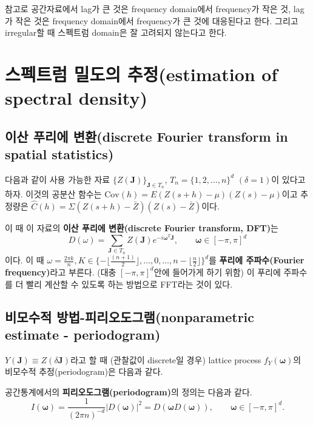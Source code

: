 \documentclass[b5paper,]{scrbook}
\theoremstyle{plain}
\theoremstyle{definition}
\numberwithin{equation}{section}
\let\BeginKnitrBlock\begin \let\EndKnitrBlock\end
\begin{document}
참고로 공간자료에서 lag가 큰 것은 frequency domain에서 frequency가 작은 것, lag가 작은 것은 frequency domain에서 frequency가 큰 것에 대응된다고 한다. 그리고 irregular할 때 스펙트럼 domain은 잘 고려되지 않는다고 한다.

\hypertarget{--estimation-of-spectral-density}{%
\section{스펙트럼 밀도의 추정(estimation of spectral density)}\label{--estimation-of-spectral-density}}

\hypertarget{--discrete-fourier-transform-in-spatial-statistics}{%
\subsection{이산 푸리에 변환(discrete Fourier transform in spatial statistics)}\label{--discrete-fourier-transform-in-spatial-statistics}}

다음과 같이 사용 가능한 자료 \(\{Z(\mathbf{J}) \}_{\mathbf{J}\in T_{n}}\), \(T_{n}=\{ 1,2,\ldots, n\}^{d}\) \((\delta=1)\)이 있다고 하자. 이것의 공분산 함수는 \(\text{Cov}(h)=E(Z(s+h)-\mu)(Z(s)-\mu)\)이고 추정량은 \(\hat{C}(h)=\Sigma(Z(s+h)-\bar{Z})(Z(s)-\bar{Z})\)이다.

이 때 이 자료의 \textbf{이산 푸리에 변환(discrete Fourier transform, DFT)}는
\[D(\omega)=\sum_{\mathbf{J}\in T_{n}}Z(\mathbf{J})e^{-i\boldsymbol{\omega}^{T}\mathbf{J}}, \qquad{\boldsymbol{\omega}\in[-\pi,\pi]^{d}}\]
이다. 이 때 \(\omega = \frac{2\pi k}{n}, K\in \{ -\lfloor\frac{(n+1)}{2}\rfloor,\ldots, 0,\ldots, n-\lfloor\frac{n}{2}\rfloor \}^{d}\)를 \textbf{푸리에 주파수(Fourier frequency)}라고 부른다. (대충 \([-\pi,\pi]^{d}\)안에 들어가게 하기 위함) 이 푸리에 주파수를 더 빨리 계산할 수 있도록 하는 방법으로 FFT라는 것이 있다.

\hypertarget{--nonparametric-estimate---periodogram}{%
\subsection{비모수적 방법-피리오도그램(nonparametric estimate - periodogram)}\label{--nonparametric-estimate---periodogram}}

\(Y(\mathbf{J})\equiv Z(\delta \mathbf{J})\)라고 할 때 (관찰값이 discrete일 경우) lattice process \(f_{Y}(\boldsymbol{\omega})\)의 비모수적 추정(periodogram)은 다음과 같다.

\BeginKnitrBlock{definition}[공간통계에서의 피리오도그램]
\protect\hypertarget{def:unnamed-chunk-376}{}{\label{def:unnamed-chunk-376} {} }공간통계에서의 \textbf{피리오도그램(periodogram)}의 정의는 다음과 같다.
\[I(\boldsymbol{\omega})=\frac{1}{(2\pi n)^{-d}}|D(\boldsymbol{\omega})|^{2}=D(\boldsymbol{\omega}D(\boldsymbol{\omega})), \qquad{\boldsymbol{\omega}\in[-\pi,\pi]^{d}}.\]
\EndKnitrBlock{definition}
\end{document}

